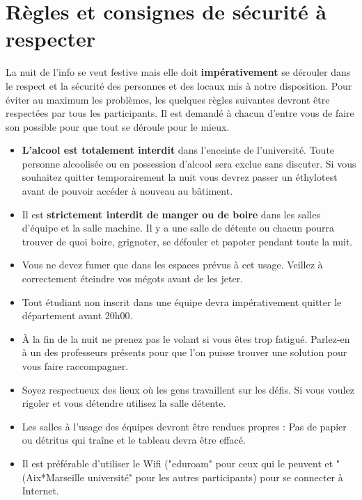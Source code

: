 \documentclass[a4paper,11pt]{article}
\begin{document}
\section{Règles et consignes de sécurité à respecter}
La nuit de l'info se veut festive mais elle doit \textbf{impérativement} se dérouler dans le respect et la sécurité des personnes et des locaux mis à notre disposition. Pour éviter au maximum les problèmes, les quelques règles suivantes devront être respectées par tous les participants. Il est demandé à chacun d'entre vous de faire son possible pour que tout se déroule pour le mieux.  
\begin{itemize}
	\item \textbf{L'alcool est totalement interdit} dans l'enceinte de l'université. Toute personne alcoolisée ou en possession d'alcool sera exclue sans discuter. Si vous souhaitez quitter temporairement la nuit vous devrez passer un éthylotest avant de pouvoir accéder à nouveau au bâtiment.
	 
	\item Il est \textbf{strictement interdit de manger ou de boire} dans les salles d'équipe et la salle machine. Il y a une salle de détente ou chacun pourra trouver de quoi boire, grignoter, se défouler et papoter pendant toute la nuit.
	
	\item Vous ne devez fumer que dans les espaces prévus à cet usage. Veillez à correctement éteindre vos mégots avant de les jeter.
	
	\item Tout étudiant non inscrit dans une équipe devra impérativement quitter le département avant 20h00.
	
	\item À la fin de la nuit ne prenez pas le volant si vous êtes trop fatigué. Parlez-en à un des professeurs présents pour que l'on puisse trouver une solution pour vous faire raccompagner.  
	
	\item Soyez respectueux des lieux où les gens travaillent sur les défis. Si vous voulez rigoler et vous détendre utilisez la salle détente.
	
	\item Les salles à l'usage des équipes devront être rendues propres : Pas de papier ou détritus qui traîne et le tableau devra être effacé. 
	
	\item Il est préférable d'utiliser le Wifi ("eduroam" pour ceux qui le peuvent et "(Aix*Marseille université" pour les autres participants) pour se connecter à Internet. 


\end{itemize}
\end{document}
